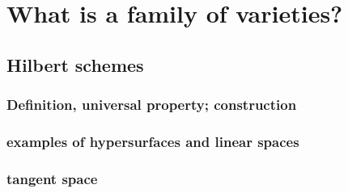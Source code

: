 %
%
%
%


\section{What is a family of varieties?}

\subsection{Hilbert schemes}

\subsubsection{Definition, universal property; construction}

\subsubsection{examples of hypersurfaces and linear spaces}

\subsubsection{tangent space}

